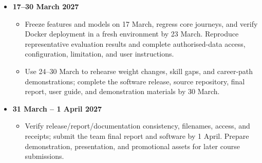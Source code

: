 \documentclass[a4paper,12pt]{article}
\begin{document}
\begin{itemize}
  \item \textbf{17--30 March 2027}
    \begin{itemize}
      \item Freeze features and models on 17 March, regress core journeys, and verify Docker deployment in a fresh environment by 23 March. Reproduce representative evaluation results and complete authorised-data access, configuration, limitation, and user instructions.
      \item Use 24--30 March to rehearse weight changes, skill gaps, and career-path demonstrations; complete the software release, source repository, final report, user guide, and demonstration materials by 30 March.
    \end{itemize}

  \item \textbf{31 March -- 1 April 2027}
    \begin{itemize}
      \item Verify release/report/documentation consistency, filenames, access, and receipts; submit the team final report and software by 1 April. Prepare demonstration, presentation, and promotional assets for later course submissions.
    \end{itemize}

\end{itemize}

\clearpage
\end{document}
